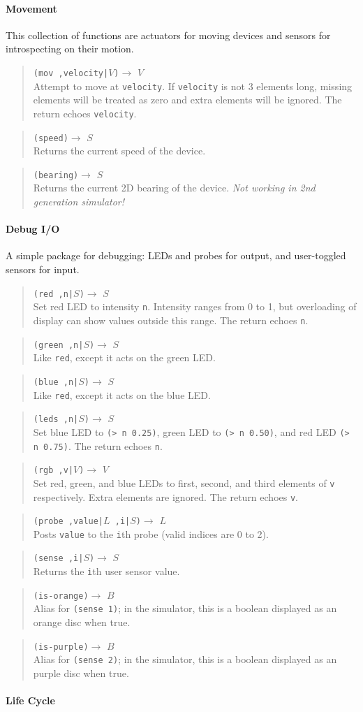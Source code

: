 \documentclass{article}
\newcommand\nosecgen{{\em Not working in 2nd generation simulator!}}
\newcommand\function[3]
{\begin{quote}{\tt #1}$\rightarrow$ \type{#2} \\ #3 \end{quote}}
\newcommand\type[1]{$#1$}
\newcommand\var[1]{{\tt #1}}
\begin{document}
\paragraph{Movement}

This collection of functions are actuators for moving devices
and sensors for introspecting on their motion.

\function{(mov ,velocity|\type{V})}{V}{Attempt to move at
  \var{velocity}.  If \var{velocity} is not 3 elements long, missing
  elements will be treated as zero and extra elements will be ignored.
  The return echoes \var{velocity}.}

\function{(speed)}{S}{Returns the current speed of the device.}

\function{(bearing)}{S}{Returns the current 2D bearing of the
  device. \nosecgen{}}

\paragraph{Debug I/O}

A simple package for debugging: LEDs and probes for output,
and user-toggled sensors for input.

\function{(red ,n|\type{S})}{S}{Set red LED to intensity \var{n}.  Intensity
  ranges from 0 to 1, but overloading of display can show values outside
  this range.  The return echoes \var{n}.}
\function{(green ,n|\type{S})}{S}{Like \var{red}, except it acts on
  the green LED.}
\function{(blue ,n|\type{S})}{S}{Like \var{red}, except it acts on
  the blue LED.}
\function{(leds ,n|\type{S})}{S}{Set blue LED to \var{(> n 0.25)}, green
  LED to \var{(> n 0.50)}, and red LED \var{(> n 0.75)}.  The return
  echoes \var{n}.}
\function{(rgb ,v|\type{V})}{V}{Set red, green, and blue LEDs to first,
  second, and third elements of \var{v} respectively.  Extra elements
  are ignored.  The return echoes \var{v}.}

\function{(probe ,value|\type{L} ,i|\type{S})}{L}{Posts \var{value} to
  the \var{i}th probe (valid indices are 0 to 2).}

\function{(sense ,i|\type{S})}{S}{Returns the \var{i}th user sensor
  value.}
\function{(is-orange)}{B}{Alias for \var{(sense 1)}; in the simulator,
  this is a boolean displayed as an orange disc when true.}
\function{(is-purple)}{B}{Alias for \var{(sense 2)}; in the simulator,
  this is a boolean displayed as an purple disc when true.}

\paragraph{Life Cycle}
\end{document}
